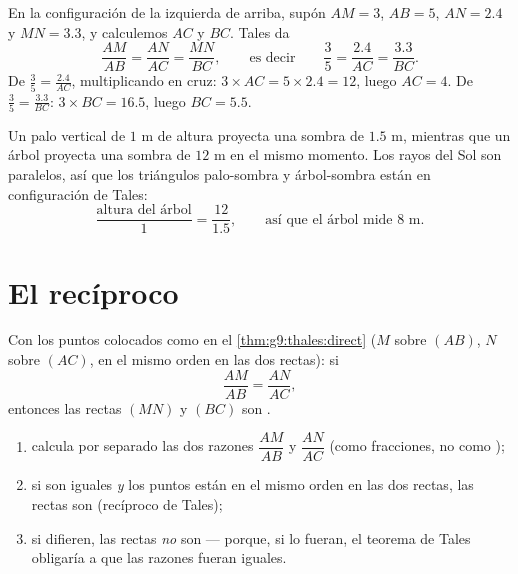 \begin{example}\label{ex:g9:thales:compute}
En la configuración de la izquierda de arriba, supón $AM = 3$, $AB = 5$, $AN = 2.4$
y $MN = 3.3$, y calculemos $AC$ y $BC$. Tales da
\[
\frac{AM}{AB} = \frac{AN}{AC} = \frac{MN}{BC},
\qquad\text{es decir}\qquad
\frac35 = \frac{2.4}{AC} = \frac{3.3}{BC}.
\]
De $\frac35 = \frac{2.4}{AC}$, multiplicando en cruz:
$3 \times AC = 5 \times 2.4 = 12$, luego $AC = 4$. De
$\frac35 = \frac{3.3}{BC}$: $3 \times BC = 16.5$, luego $BC = 5.5$.
\end{example}

\begin{example}\label{ex:g9:thales:stick}
Un palo vertical de $1$ m de altura proyecta una sombra de $1.5$ m, mientras que un árbol
proyecta una sombra de $12$ m en el mismo momento. Los rayos del Sol son paralelos, así que
los triángulos palo-sombra y árbol-sombra están en configuración de
Tales:
\[
\frac{\text{altura del árbol}}{1} = \frac{12}{1.5},
\qquad\text{así que el árbol mide } 8 \text{ m.}
\]
\end{example}

\section{El recíproco}

\begin{theorem}\label{thm:g9:thales:converse}
Con los puntos colocados como en el \cref{thm:g9:thales:direct} ($M$ sobre $(AB)$,
$N$ sobre $(AC)$, en el mismo orden en las dos rectas):
si
\[
\frac{AM}{AB} = \frac{AN}{AC},
\]
entonces las rectas $(MN)$ y $(BC)$ son .
\end{theorem}
\admitted

\begin{method}\label{met:g9:thales:converse}
\begin{enumerate}
  \item calcula por separado las dos razones $\dfrac{AM}{AB}$ y
        $\dfrac{AN}{AC}$ (como fracciones, no como );
  \item si son iguales \emph{y} los puntos están en el mismo orden en
        las dos rectas, las rectas son  (recíproco de Tales);
  \item si difieren, las rectas \emph{no} son  --- porque, si
        lo fueran, el teorema de Tales obligaría a que las razones fueran iguales.
\end{enumerate}
\end{method}

